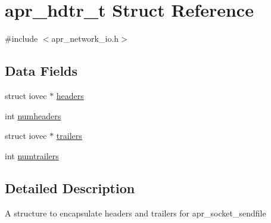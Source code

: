 \hypertarget{structapr__hdtr__t}{\section{apr\-\_\-hdtr\-\_\-t Struct Reference}
\label{structapr__hdtr__t}
}


{\ttfamily \#include $<$apr\-\_\-network\-\_\-io.\-h$>$}

\subsection*{Data Fields}
\begin{DoxyCompactItemize}
\item 
struct iovec $\ast$ \hyperlink{structapr__hdtr__t_afc2035a3ef314f9aa6ae3aabe7c0dc72}{headers}
\item 
int \hyperlink{structapr__hdtr__t_a8915ade68ef06f4d23005ec0f81e9305}{numheaders}
\item 
struct iovec $\ast$ \hyperlink{structapr__hdtr__t_a538387cfa0065abc2bfa6ba7393fa3ee}{trailers}
\item 
int \hyperlink{structapr__hdtr__t_a9468659de891a5672b0b84cf442e9c7b}{numtrailers}
\end{DoxyCompactItemize}


\subsection{Detailed Description}
A structure to encapsulate headers and trailers for apr\-\_\-socket\-\_\-sendfile 

